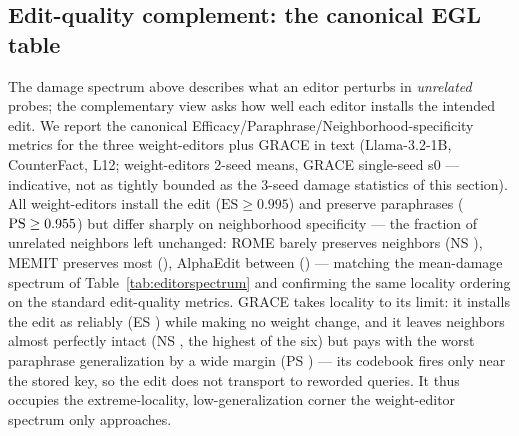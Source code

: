 \subsection{Edit-quality complement: the canonical EGL table}
\label{sec:egl}
The damage spectrum above describes what an editor perturbs in
\emph{unrelated} probes; the complementary view asks how well each editor
installs the intended edit. We report the canonical
Efficacy/Paraphrase/Neighborhood-specificity metrics for the three
weight-editors plus GRACE in text (Llama-3.2-1B, CounterFact, L12;
weight-editors 2-seed means, GRACE single-seed s0 --- indicative, not as
tightly bounded as the 3-seed damage statistics of this section).
All weight-editors install the edit ($\text{ES}\ge 0.995$) and preserve
paraphrases ($\text{PS}\ge0.955{}$) but differ sharply on neighborhood
specificity --- the fraction of unrelated neighbors left unchanged: ROME barely
preserves neighbors (NS \eglRomeNS{}), MEMIT preserves most (\eglMemitNS{}),
AlphaEdit between (\eglAlphaNS{}) --- matching the mean-damage spectrum of
Table~\ref{tab:editorspectrum} and confirming the same locality ordering on the
standard edit-quality metrics.
GRACE takes locality to its limit: it installs the edit as reliably
(ES \eglGraceES{}) while making no weight change, and it leaves neighbors
almost perfectly intact (NS \eglGraceNS{}, the highest of the six) but pays with
the worst paraphrase generalization by a wide margin (PS \eglGracePS{}) --- its
codebook fires only near the stored key, so the edit does not transport to
reworded queries. It thus occupies the extreme-locality, low-generalization
corner the weight-editor spectrum only approaches.
